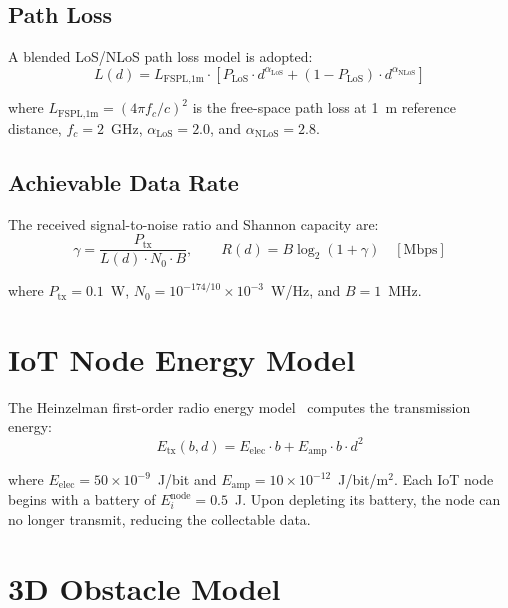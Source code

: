\documentclass[12pt, a4paper, oneside]{report}
\begin{document}
\subsection{Path Loss}

A blended LoS/NLoS path loss model is adopted:
\begin{equation}
L(d) = L_{\text{FSPL,1m}} \cdot \left[P_{\text{LoS}} \cdot d^{\alpha_{\text{LoS}}} + (1 - P_{\text{LoS}}) \cdot d^{\alpha_{\text{NLoS}}}\right]
\label{eq:pathloss}
\end{equation}

where $L_{\text{FSPL,1m}} = (4\pi f_c / c)^2$ is the free-space path loss at 1~m reference distance, $f_c = 2$~GHz, $\alpha_{\text{LoS}} = 2.0$, and $\alpha_{\text{NLoS}} = 2.8$.

\subsection{Achievable Data Rate}

The received signal-to-noise ratio and Shannon capacity are:
\begin{equation}
\gamma = \frac{P_{\text{tx}}}{L(d) \cdot N_0 \cdot B}, \qquad R(d) = B \log_2(1 + \gamma) \quad [\text{Mbps}]
\label{eq:data_rate}
\end{equation}

where $P_{\text{tx}} = 0.1$~W, $N_0 = 10^{-174/10} \times 10^{-3}$~W/Hz, and $B = 1$~MHz.

\section{IoT Node Energy Model}

The Heinzelman first-order radio energy model~\cite{heinzelman2000leach} computes the transmission energy:
\begin{equation}
E_{\text{tx}}(b, d) = E_{\text{elec}} \cdot b + E_{\text{amp}} \cdot b \cdot d^2
\label{eq:node_energy}
\end{equation}

where $E_{\text{elec}} = 50 \times 10^{-9}$~J/bit and $E_{\text{amp}} = 10 \times 10^{-12}$~J/bit/m$^2$. Each IoT node begins with a battery of $E_i^{\text{node}} = 0.5$~J. Upon depleting its battery, the node can no longer transmit, reducing the collectable data.

\section{3D Obstacle Model}
\end{document}
